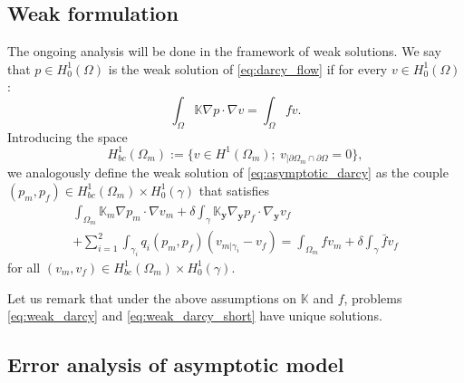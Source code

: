 \documentclass{llncs}
\def\vc#1{\mathbf{\boldsymbol{#1}}}     %
\def\tn#1{{\mathbb{#1}}}    %
\def\yy{{\vc y}}
\begin{document}
\subsection{Weak formulation}

The ongoing analysis will be done in the framework of weak solutions.
We say that $p\in H^1_0(\Omega)$ is the weak solution of \eqref{eq:darcy_flow} if for every $v\in H^1_0(\Omega)$:
\begin{equation}
\label{eq:weak_darcy}
\int_\Omega \tn K\nabla p\cdot\nabla v = \int_\Omega f v.
\end{equation}
Introducing the space
\[ H^1_{bc}(\Omega_m) := \{v\in H^1(\Omega_m);~v_{|\partial\Omega_m\cap\partial\Omega}=0\}, \]
we analogously define the weak solution of \eqref{eq:asymptotic_darcy} as the couple $(p_m,p_f)\in H^1_{bc}(\Omega_m)\times H^1_0(\gamma)$ that satisfies
\begin{multline}
\label{eq:weak_darcy_short}
\int_{\Omega_m}\tn K_m\nabla p_m\cdot\nabla v_m
+\delta\int_{\gamma}\tn K_\yy\nabla_\yy p_f\cdot\nabla_\yy v_f\\
+ \sum_{i=1}^2\int_{\gamma_i} q_i(p_m,p_f)(v_{m|\gamma_i} - v_f)
 = \int_{\Omega_m} f v_m + \delta\int_\gamma\bar f v_f
\end{multline}
for all $(v_m,v_f)\in H^1_{bc}(\Omega_m)\times H^1_0(\gamma)$.

Let us remark that under the above assumptions on $\tn K$ and $f$, problems \eqref{eq:weak_darcy} and \eqref{eq:weak_darcy_short} have unique solutions.



\subsection{Error analysis of asymptotic model}
\label{sc:error_estimate}
\end{document}
